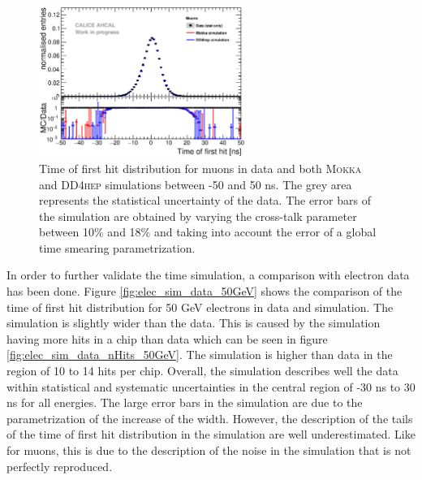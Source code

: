 \documentclass{JINST}
\newcommand\mokka{\textsc{Mokka}\xspace}
\newcommand\ddhep{\textsc{DD4hep}\xspace}
\begin{document}
\begin{figure}[htbp!]
  \centering
  \includegraphics[width=0.6\textwidth]{fig/Comparison_MokkaDD4hepData_Muons.eps}
  \caption{Time of first hit distribution for muons in data and both \mokka and \ddhep simulations between -50 and 50 ns. The grey area represents the statistical uncertainty of the data. The error bars of the simulation are obtained by varying the cross-talk parameter between 10\% and 18\% and taking into account the error of a global time smearing parametrization.}
  \label{fig:sim_data_muon}
\end{figure}

In order to further validate the time simulation, a comparison with electron data has been done. Figure \ref{fig:elec_sim_data_50GeV} shows the comparison of the time of first hit distribution for 50 GeV electrons in data and simulation. The simulation is slightly wider than the data. This is caused by the simulation having more hits in a chip than data which can be seen in figure \ref{fig:elec_sim_data_nHits_50GeV}. The simulation is higher than data in the region of 10 to 14 hits per chip. Overall, the simulation describes well the data within statistical and systematic uncertainties in the central region of -30 ns to 30 ns for all energies. The large error bars in the simulation are due to the parametrization of the increase of the width. However, the description of the tails of the time of first hit distribution in the simulation are well underestimated. Like for muons, this is due to the description of the noise in the simulation that is not perfectly reproduced.
\end{document}
